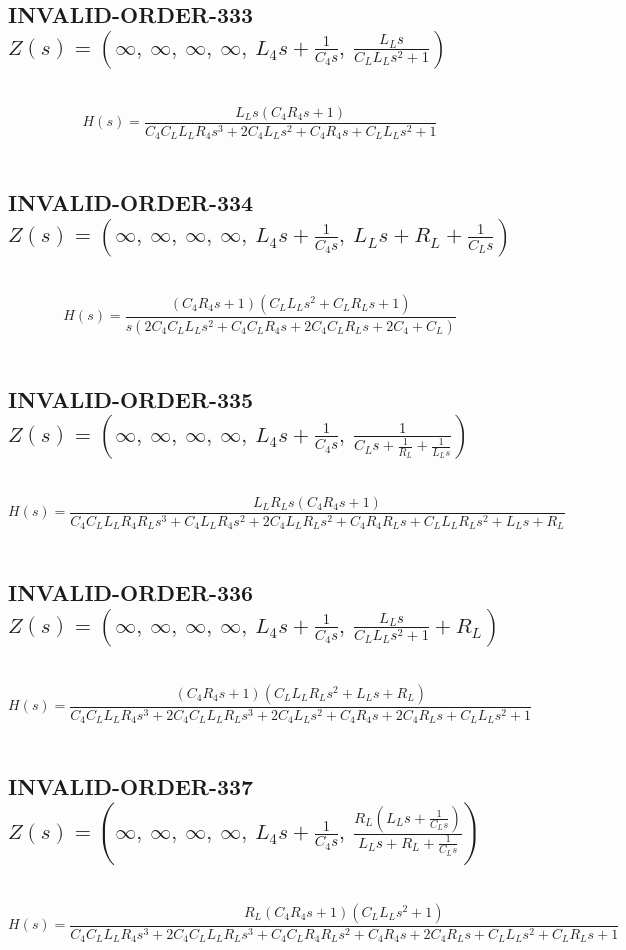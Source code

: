 \documentclass{article}
\begin{document}
\subsection{INVALID-ORDER-333 $Z(s) = \left( \infty, \  \infty, \  \infty, \  \infty, \  L_{4} s + \frac{1}{C_{4} s}, \  \frac{L_{L} s}{C_{L} L_{L} s^{2} + 1}\right)$ } \ 
\textbf{\[H(s) = \frac{L_{L} s \left(C_{4} R_{4} s + 1\right)}{C_{4} C_{L} L_{L} R_{4} s^{3} + 2 C_{4} L_{L} s^{2} + C_{4} R_{4} s + C_{L} L_{L} s^{2} + 1}\] } \ 
\subsection{INVALID-ORDER-334 $Z(s) = \left( \infty, \  \infty, \  \infty, \  \infty, \  L_{4} s + \frac{1}{C_{4} s}, \  L_{L} s + R_{L} + \frac{1}{C_{L} s}\right)$ } \ 
\textbf{\[H(s) = \frac{\left(C_{4} R_{4} s + 1\right) \left(C_{L} L_{L} s^{2} + C_{L} R_{L} s + 1\right)}{s \left(2 C_{4} C_{L} L_{L} s^{2} + C_{4} C_{L} R_{4} s + 2 C_{4} C_{L} R_{L} s + 2 C_{4} + C_{L}\right)}\] } \ 
\subsection{INVALID-ORDER-335 $Z(s) = \left( \infty, \  \infty, \  \infty, \  \infty, \  L_{4} s + \frac{1}{C_{4} s}, \  \frac{1}{C_{L} s + \frac{1}{R_{L}} + \frac{1}{L_{L} s}}\right)$ } \ 
\textbf{\[H(s) = \frac{L_{L} R_{L} s \left(C_{4} R_{4} s + 1\right)}{C_{4} C_{L} L_{L} R_{4} R_{L} s^{3} + C_{4} L_{L} R_{4} s^{2} + 2 C_{4} L_{L} R_{L} s^{2} + C_{4} R_{4} R_{L} s + C_{L} L_{L} R_{L} s^{2} + L_{L} s + R_{L}}\] } \ 
\subsection{INVALID-ORDER-336 $Z(s) = \left( \infty, \  \infty, \  \infty, \  \infty, \  L_{4} s + \frac{1}{C_{4} s}, \  \frac{L_{L} s}{C_{L} L_{L} s^{2} + 1} + R_{L}\right)$ } \ 
\textbf{\[H(s) = \frac{\left(C_{4} R_{4} s + 1\right) \left(C_{L} L_{L} R_{L} s^{2} + L_{L} s + R_{L}\right)}{C_{4} C_{L} L_{L} R_{4} s^{3} + 2 C_{4} C_{L} L_{L} R_{L} s^{3} + 2 C_{4} L_{L} s^{2} + C_{4} R_{4} s + 2 C_{4} R_{L} s + C_{L} L_{L} s^{2} + 1}\] } \ 
\subsection{INVALID-ORDER-337 $Z(s) = \left( \infty, \  \infty, \  \infty, \  \infty, \  L_{4} s + \frac{1}{C_{4} s}, \  \frac{R_{L} \left(L_{L} s + \frac{1}{C_{L} s}\right)}{L_{L} s + R_{L} + \frac{1}{C_{L} s}}\right)$ } \ 
\textbf{\[H(s) = \frac{R_{L} \left(C_{4} R_{4} s + 1\right) \left(C_{L} L_{L} s^{2} + 1\right)}{C_{4} C_{L} L_{L} R_{4} s^{3} + 2 C_{4} C_{L} L_{L} R_{L} s^{3} + C_{4} C_{L} R_{4} R_{L} s^{2} + C_{4} R_{4} s + 2 C_{4} R_{L} s + C_{L} L_{L} s^{2} + C_{L} R_{L} s + 1}\] } \ 
\end{document}
